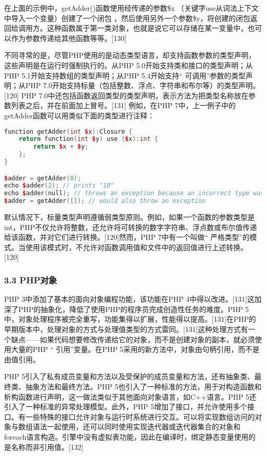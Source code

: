 在上面的示例中，getAdder()函数使用经传递的参数\$x （关键字use从词法上下文中导入一个变量）创建了一个闭包 ，然后使用另外一个参数\$y，将创建的闭包返回给调用方。这种函数属于第一类对象，也就是说它可以存储在某一变量中，也可以作为参数传递给其他函数等等。[130]

不同寻常的是，尽管PHP使用的是动态类型语言，却支持函数参数的类型声明，这些声明是在运行时强制执行的。从PHP 5.0开始支持类和接口的类型声明；从PHP 5.1开始支持数组的类型声明；从PHP 5.4开始支持“ 可调用”参数的类型声明；从PHP 7.0开始支持标量（包括整数、浮点、字符串和布尔等）的类型声明。[120] PHP 7.0中还包括函数返回类型的类型声明，表示方法为把类型名称放在参数列表之后，并在前面加上冒号。[131] 例如，在PHP 7中，上一例子中的getAdder函数可以用类似下面的类型进行注释：

\begin{lstlisting}[language=cpp]
function getAdder(int $x):Closure {
    return function(int $y) use ($x):int {
        return $x + $y;
    };
}

$adder = getAdder(8);
echo $adder(2); // prints "10"
echo $adder(null); // throws an exception because an incorrect type was passed
$adder = getAdder([]); // would also throw an exception
\end{lstlisting}
默认情况下，标量类型声明遵循弱类型原则。例如，如果一个函数的参数类型是int，PHP不仅允许将整数，还允许将可转换的数字字符串、浮点数或布尔值传递给该函数，并对它们进行转换。[120]然而，PHP 7中有一个叫做“ 严格类型”的模式。当使用该模式时，不允许对函数调用值和文件中的返回值进行上述转换。[120]

\subsubsection{3.3 PHP对象}
PHP 3中添加了基本的面向对象编程功能，该功能在PHP 4中得以改进。[131]这加深了PHP的抽象化，降低了使用PHP的程序员完成创造性任务的难度。PHP 5中，对象处理程序被完全重写，功能集得以扩展，性能得以提高。[131]在PHP的早期版本中，处理对象的方式与处理值类型的方式雷同。[131]这种处理方式有一个缺点——如果代码想要修改传递给它的对象，而不是创建对象的副本，就必须使用大量的PHP “ 引用”变量。在PHP 5采用的新方法中，对象由句柄引用，而不是由值引用。

PHP 5引入了私有成员变量和方法以及受保护的成员变量和方法，还有抽象类、最终类、抽象方法和最终方法。PHP 5也引入了一种标准的方法，用于对构造函数和析构函数进行声明，这一做法类似于其他面向对象语言，如C++语言。PHP 5还引入了一种标准的异常处理模型。此外，PHP 5增加了接口，并允许使用多个接口。有一些特殊的接口允许对象与运行时系统进行交互。可以将实现数组访问的对象与数组语法一起使用，还可以同时使用实现迭代器或迭代器集合的对象和foreach语言构造。引擎中没有虚拟表功能，因此在编译时，绑定静态变量使用的是名称而非引用值。[132]

